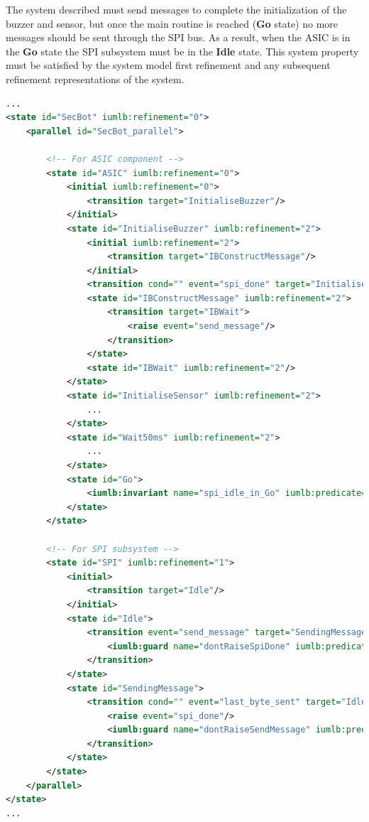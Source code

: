 The system described must send messages to complete the initialization of the buzzer and sensor, but once the main routine is reached (\textbf{Go} state) no more messages should be sent through the SPI bus. As a result, when the ASIC is in the \textbf{Go} state the SPI subsystem must be in the \textbf{Idle} state. This system property must be satisfied by the system model first refinement and any subsequent refinement representations of the system.


\begin{lstlisting}[caption=Snippet for SCXML representation of SecBot model,label={lst:secBot}, language=xml]
...
<state id="SecBot" iumlb:refinement="0">
    <parallel id="SecBot_parallel">

     	<!-- For ASIC component -->
    	<state id="ASIC" iumlb:refinement="0">
        	<initial iumlb:refinement="0">
          		<transition target="InitialiseBuzzer"/>
        	</initial>
        	<state id="InitialiseBuzzer" iumlb:refinement="2">
        		<initial iumlb:refinement="2">
	            	<transition target="IBConstructMessage"/>
	          	</initial>
          		<transition cond="" event="spi_done" target="InitialiseSensor"/>
          		<state id="IBConstructMessage" iumlb:refinement="2">
	            	<transition target="IBWait">
	              		<raise event="send_message"/>
	            	</transition>
          		</state>
          		<state id="IBWait" iumlb:refinement="2"/>
        	</state>
       		<state id="InitialiseSensor" iumlb:refinement="2">
        		...
        	</state>
        	<state id="Wait50ms" iumlb:refinement="2">
          		...
        	</state>
        	<state id="Go">
          		<iumlb:invariant name="spi_idle_in_Go" iumlb:predicate="Idle = TRUE" iumlb:refinement="1"/>
        	</state>
      	</state>

      	<!-- For SPI subsystem -->
      	<state id="SPI" iumlb:refinement="1">
	        <initial>
	        	<transition target="Idle"/>
	        </initial>
	        <state id="Idle">
				<transition event="send_message" target="SendingMessage">
					<iumlb:guard name="dontRaiseSpiDone" iumlb:predicate="spi_done ∉ SCXML_raisedTriggers" iumlb:refinement="1"/>
				</transition>
        	</state>
			<state id="SendingMessage">
				<transition cond="" event="last_byte_sent" target="Idle">
					<raise event="spi_done"/>
					<iumlb:guard name="dontRaiseSendMessage" iumlb:predicate="send_message ∉ SCXML_raisedTriggers" iumlb:refinement="1"/>
				</transition>
			</state>
		</state>
	</parallel>
</state>
...
\end{lstlisting}





